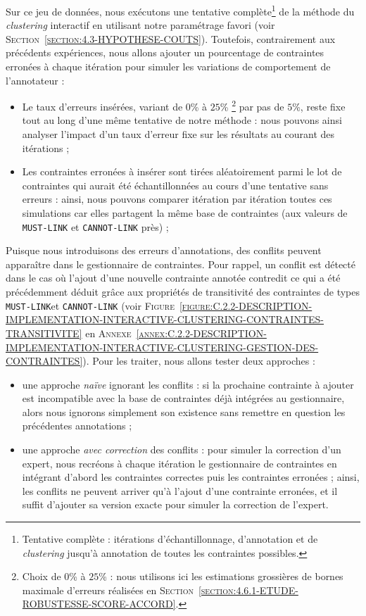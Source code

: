 			Sur ce jeu de données, nous exécutons une tentative complète\footnote{
				Tentative complète : itérations d'échantillonnage, d'annotation et de \textit{clustering} jusqu'à annotation de toutes les contraintes possibles.
			} de la méthode du \textit{clustering} interactif en utilisant notre paramétrage favori (voir \textsc{Section~\ref{section:4.3-HYPOTHESE-COUTS}}).
			Toutefois, contrairement aux précédents expériences, nous allons ajouter un pourcentage de contraintes erronées à chaque itération pour simuler les variations de comportement de l'annotateur :
			\begin{itemize}
				\item Le taux d'erreurs insérées, variant de $0$\% à $25$\% \footnote{
					Choix de $0$\% à $25$\% : nous utilisons ici les estimations grossières de bornes maximale d'erreurs réalisées en \textsc{Section~\ref{section:4.6.1-ETUDE-ROBUSTESSE-SCORE-ACCORD}}.
				} par pas de $5$\%, reste fixe tout au long d'une même tentative de notre méthode : nous pouvons ainsi analyser l'impact d'un taux d'erreur fixe sur les résultats au courant des itérations ;
				\item Les contraintes erronées à insérer sont tirées aléatoirement parmi le lot de contraintes qui aurait été échantillonnées au cours d'une tentative sans erreurs : ainsi, nous pouvons comparer itération par itération toutes ces simulations car elles partagent la même base de contraintes (aux valeurs de \texttt{MUST-LINK} et \texttt{CANNOT-LINK} près) ;
			\end{itemize}
			
			Puisque nous introduisons des erreurs d'annotations, des conflits peuvent apparaître dans le gestionnaire de contraintes.
			Pour rappel, un conflit est détecté dans le cas où l'ajout d'une nouvelle contrainte annotée contredit ce qui a été précédemment déduit grâce aux propriétés de transitivité des contraintes de types \texttt{MUST-LINK}et \texttt{CANNOT-LINK} (voir \textsc{Figure~\ref{figure:C.2.2-DESCRIPTION-IMPLEMENTATION-INTERACTIVE-CLUSTERING-CONTRAINTES-TRANSITIVITE}} en \textsc{Annexe~\ref{annex:C.2.2-DESCRIPTION-IMPLEMENTATION-INTERACTIVE-CLUSTERING-GESTION-DES-CONTRAINTES}}).
			Pour les traiter, nous allons tester deux approches :
			\begin{itemize}
				\item une approche \textit{naïve} ignorant les conflits : si la prochaine contrainte à ajouter est incompatible avec la base de contraintes déjà intégrées au gestionnaire, alors nous ignorons simplement son existence sans remettre en question les précédentes annotations ;
				\item une approche \textit{avec correction} des conflits : pour simuler la correction d'un expert, nous recréons à chaque itération le gestionnaire de contraintes en intégrant d'abord les contraintes correctes puis les contraintes erronées ; ainsi, les conflits ne peuvent arriver qu'à l'ajout d'une contrainte erronées, et il suffit d'ajouter sa version exacte pour simuler la correction de l'expert.
			\end{itemize}
			

